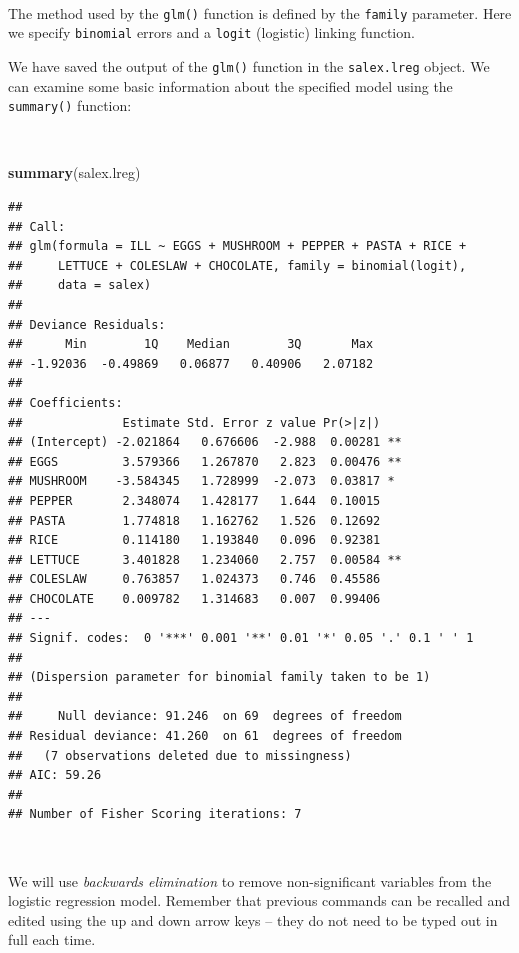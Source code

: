 \documentclass[12pt,a4paper]{book}
\newenvironment{Shaded}{\begin{snugshade}}{\end{snugshade}}
\newcommand{\KeywordTok}[1]{\textcolor[rgb]{0.13,0.29,0.53}{\textbf{#1}}}
\newcommand{\NormalTok}[1]{#1}
\theoremstyle{definition}
\theoremstyle{definition}
\theoremstyle{definition}
\theoremstyle{remark}
\begin{document}
~

The method used by the \texttt{glm()} function is defined by the
\texttt{family} parameter. Here we specify \texttt{binomial} errors and
a \texttt{logit} (logistic) linking function.

We have saved the output of the \texttt{glm()} function in the
\texttt{salex.lreg} object. We can examine some basic information about
the specified model using the \texttt{summary()} function:

~

\begin{Shaded}
\begin{Highlighting}[]
\KeywordTok{summary}\NormalTok{(salex.lreg)}
\end{Highlighting}
\end{Shaded}

\begin{verbatim}
## 
## Call:
## glm(formula = ILL ~ EGGS + MUSHROOM + PEPPER + PASTA + RICE + 
##     LETTUCE + COLESLAW + CHOCOLATE, family = binomial(logit), 
##     data = salex)
## 
## Deviance Residuals: 
##      Min        1Q    Median        3Q       Max  
## -1.92036  -0.49869   0.06877   0.40906   2.07182  
## 
## Coefficients:
##              Estimate Std. Error z value Pr(>|z|)   
## (Intercept) -2.021864   0.676606  -2.988  0.00281 **
## EGGS         3.579366   1.267870   2.823  0.00476 **
## MUSHROOM    -3.584345   1.728999  -2.073  0.03817 * 
## PEPPER       2.348074   1.428177   1.644  0.10015   
## PASTA        1.774818   1.162762   1.526  0.12692   
## RICE         0.114180   1.193840   0.096  0.92381   
## LETTUCE      3.401828   1.234060   2.757  0.00584 **
## COLESLAW     0.763857   1.024373   0.746  0.45586   
## CHOCOLATE    0.009782   1.314683   0.007  0.99406   
## ---
## Signif. codes:  0 '***' 0.001 '**' 0.01 '*' 0.05 '.' 0.1 ' ' 1
## 
## (Dispersion parameter for binomial family taken to be 1)
## 
##     Null deviance: 91.246  on 69  degrees of freedom
## Residual deviance: 41.260  on 61  degrees of freedom
##   (7 observations deleted due to missingness)
## AIC: 59.26
## 
## Number of Fisher Scoring iterations: 7
\end{verbatim}

~

We will use \emph{backwards elimination} to remove non-significant
variables from the logistic regression model. Remember that previous
commands can be recalled and edited using the up and down arrow keys --
they do not need to be typed out in full each time.
\end{document}
